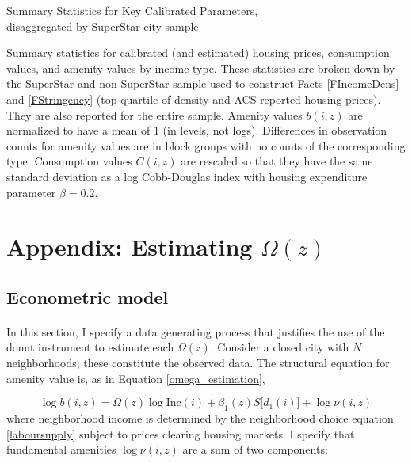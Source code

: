 \documentclass[12pt]{article}
\begin{document}
	\begin{table}
		\caption{Summary Statistics for Key Calibrated Parameters, \\ disaggregated by SuperStar city sample}\label{table:CalibParaSuperstar}
		\makebox[\textwidth]{}
		\caption*{Summary statistics for calibrated (and estimated) housing prices, consumption values, and amenity values by income type. These statistics are broken down by the SuperStar and non-SuperStar sample used to construct Facts \ref{FIncomeDens} and \ref{FStringency} (top quartile of density and ACS reported housing prices). They are also reported for the entire sample. Amenity values $b(i, z)$ are normalized to have a mean of 1 (in levels, not logs). Differences in observation counts for amenity values are in block groups with no counts of the corresponding type. Consumption values $C(i, z)$ are rescaled so that they have the same standard deviation as a log Cobb-Douglas index with housing expenditure parameter $\beta = 0.2$.}
	\end{table}

	
	\clearpage
	
	\section{Appendix: Estimating $\Omega(z)$}\label{Appendix:Estimation}
	
	\subsection{Econometric model}\label{Appendix:EconometricModel}
	\paragraph*{}
	In this section, I specify a data generating process that justifies the use of the donut instrument to estimate each $\Omega(z)$. Consider a closed city with $N$ neighborhoods; these constitute the observed data. The structural equation for amenity value is, as in Equation \eqref{omega_estimation},
	
	\begin{equation*}
		\log b(i, z) = \Omega(z) \log \text{Inc}(i) + \beta_{1}(z)S\big[d_{1}(i)\big] + \log \nu(i, z)
	\end{equation*}
	where neighborhood income is determined by the neighborhood choice equation \eqref{laboursupply} subject to prices clearing housing markets. I specify that fundamental amenities $\log \nu(i, z)$ are a sum of two components:
	
\end{document}
